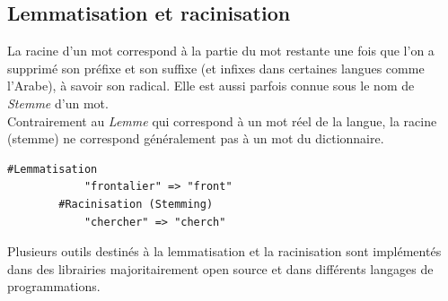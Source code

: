     \subsection{Lemmatisation et racinisation}
    La racine d'un mot correspond à la partie du mot restante une fois que l'on a supprimé son préfixe et son suffixe (et infixes dans certaines langues comme l'Arabe), à savoir son radical. Elle est aussi parfois connue sous le nom de \emph{Stemme} d'un mot.\\ 
    Contrairement au \emph{Lemme} qui correspond à un mot réel de la langue, la racine (stemme) ne correspond généralement pas à un mot du dictionnaire.
    \begin{lstlisting}[style=code]
        #Lemmatisation 
            "frontalier" => "front"  
        #Racinisation (Stemming)
            "chercher" => "cherch"
    \end{lstlisting}
    Plusieurs outils destinés à la lemmatisation et la racinisation sont implémentés dans des librairies majoritairement open source et dans différents langages de programmations.

